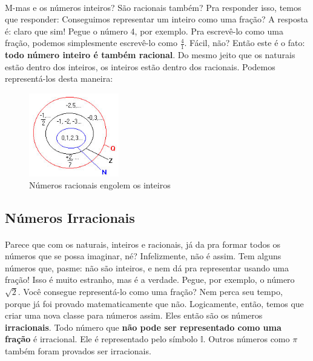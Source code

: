 \documentclass[11pt]{article}
\begin{document}
\paragraph{}
M-mas e os números
inteiros? São racionais também? Pra responder isso, temos que responder: 
Conseguimos representar um inteiro como uma fração? A resposta é: 
claro que sim! Pegue o número 4, por exemplo. Pra escrevê-lo como uma fração,
podemos simplesmente escrevê-lo como $\frac{4}{1}$. Fácil, não? Então este é
o fato: \textbf{todo número inteiro é também racional}. Do mesmo jeito que os
naturais estão dentro dos inteiros, os inteiros estão dentro dos racionais.
Podemos representá-los desta maneira:
\begin{figure}[H]
	\centering
	\includegraphics[width=0.35\textwidth]{imgs/n_z_q.jpg}
	\caption[9pt]{Números racionais engolem os inteiros}
\end{figure}

\subsection{Números Irracionais}
\paragraph{}
Parece que com os naturais, inteiros e racionais, já da pra formar todos os 
números que se possa imaginar, né? Infelizmente, não é assim. Tem alguns 
números que, pasme: não são inteiros, e nem dá pra representar usando uma
fração! Isso é muito estranho, mas é a verdade. Pegue, por exemplo, o número
$\sqrt{2}$. Você consegue representá-lo como uma fração? Nem perca seu tempo,
porque já foi provado matematicamente que não. Logicamente, então, temos
que criar uma nova classe para números assim. Eles então são os números 
\textbf{irracionais}. Todo número que 
\textbf{não pode ser representado como uma fração} é irracional. 
Ele é representado pelo símbolo $\mathbb{I}$.
Outros números como $\pi$ também foram provados ser irracionais. 
\end{document}
